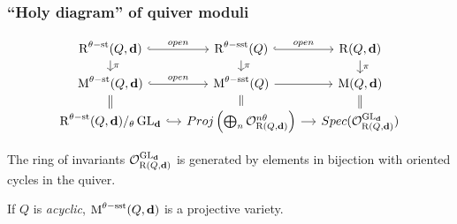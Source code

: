\documentclass{beamer}
\begin{document}
\begin{frame}
    \frametitle{``Holy diagram'' of quiver moduli}
    \[\begin{tikzcd}[row sep=small, column sep=small, ampersand replacement=\&]
        \parameterspace^{\theta\stable}(Q, \tuple{d}) \arrow[r, hook, "open"] \arrow[d, "\pi"]   \& \parameterspace^{\theta\semistable}(Q) \arrow[r, hook, "open"] \arrow[d, "\pi"]                                   \& \parameterspace(Q, \tuple{d}) \arrow[d, "\pi"] \\ 
        \modulispace^{\theta\stable}(Q, \tuple{d}) \arrow[r, hook, "open"] \arrow[d, equal]    \&  \modulispace^{\theta\semistable}(Q) \arrow[r] \arrow[d, equal]                                       \& \modulispace(Q, \tuple{d}) \arrow[d, equal] \\
        \parameterspace^{\theta\stable}(Q, \tuple{d}) /_\theta \GL_{\tuple{d}} \arrow[r, hook]           \&  Proj \left(\bigoplus_{n} \mathcal{O}_{\parameterspace(Q, \tuple{d})}^{n\theta}\right) \arrow[r]    \& Spec(\mathcal{O}_{\parameterspace(Q, \tuple{d})}^{\GL_{\tuple{d}}})
    \end{tikzcd} \] \pause
\begin{lemma}
    The ring of invariants $\mathcal{O}^{\operatorname{GL}_{\mathbf{d}}}_{\operatorname{R}(Q, \mathbf{d})}$
    is generated by elements in bijection with oriented cycles in the quiver.
\end{lemma} \pause
\begin{corollary}
    If $Q$ is \emph{acyclic}, $\operatorname{M}^{\theta-\mathrm{sst}}(Q, \mathbf{d})$ is a projective variety.
\end{corollary}
\end{frame}
\end{document}
